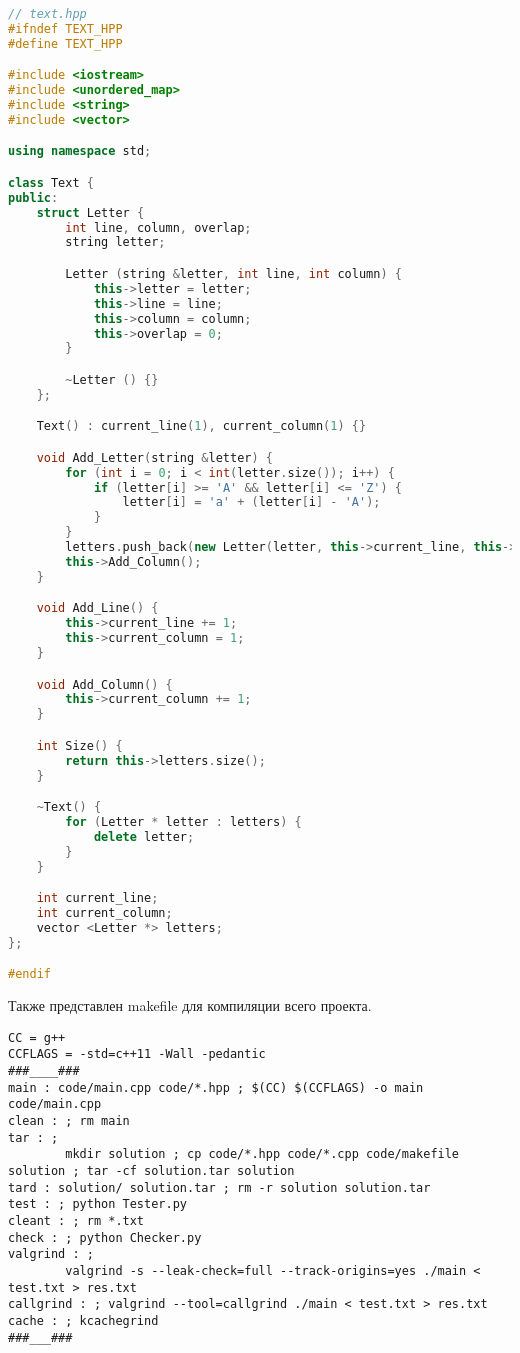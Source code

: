 \begin{lstlisting}[language=C++]
// text.hpp
#ifndef TEXT_HPP
#define TEXT_HPP

#include <iostream>
#include <unordered_map>
#include <string>
#include <vector>

using namespace std;

class Text {
public:
    struct Letter {
        int line, column, overlap;
        string letter;

        Letter (string &letter, int line, int column) {
            this->letter = letter;
            this->line = line;
            this->column = column;
            this->overlap = 0;
        }

        ~Letter () {}
    };

    Text() : current_line(1), current_column(1) {}

    void Add_Letter(string &letter) {
        for (int i = 0; i < int(letter.size()); i++) {
            if (letter[i] >= 'A' && letter[i] <= 'Z') {
                letter[i] = 'a' + (letter[i] - 'A');
            }
        }
        letters.push_back(new Letter(letter, this->current_line, this->current_column));
        this->Add_Column();
    }

    void Add_Line() {
        this->current_line += 1;
        this->current_column = 1;
    }

    void Add_Column() {
        this->current_column += 1;
    }

    int Size() {
        return this->letters.size();
    }

    ~Text() {
        for (Letter * letter : letters) {
            delete letter;
        }
    }

    int current_line;
    int current_column;
    vector <Letter *> letters;
};

#endif

\end{lstlisting}

\pagebreak

Также представлен makefile для компиляции всего проекта.

\lstset{language=[gnu] make}

\begin{lstlisting}
CC = g++
CCFLAGS = -std=c++11 -Wall -pedantic
###____###
main : code/main.cpp code/*.hpp ; $(CC) $(CCFLAGS) -o main code/main.cpp
clean : ; rm main
tar : ; 
        mkdir solution ; cp code/*.hpp code/*.cpp code/makefile solution ; tar -cf solution.tar solution
tard : solution/ solution.tar ; rm -r solution solution.tar
test : ; python Tester.py
cleant : ; rm *.txt
check : ; python Checker.py
valgrind : ; 
        valgrind -s --leak-check=full --track-origins=yes ./main < test.txt > res.txt
callgrind : ; valgrind --tool=callgrind ./main < test.txt > res.txt
cache : ; kcachegrind
###___###
\end{lstlisting}

